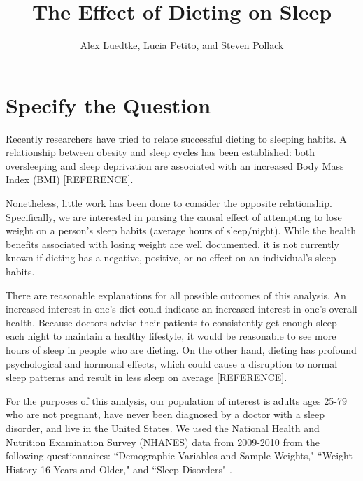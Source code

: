 \documentclass{article}
\begin{document}
%

\newcommand{\E}{\mathbb{E}}
\newcommand{\indp}{\ensuremath{\perp\hspace{-5pt}\perp}}
\newcommand{\M}{\mathcal{M}}
\newcommand{\given}{\; \mid \;}



\title{\textbf{The Effect of Dieting on Sleep}}
\author{Alex Luedtke, Lucia Petito, and Steven Pollack}
\date{}
\maketitle

\section{Specify the Question}

Recently researchers have tried to relate successful dieting to sleeping habits.  A relationship between obesity and sleep cycles has been established: both oversleeping and sleep deprivation are associated with an increased Body Mass Index (BMI) [REFERENCE]. 

Nonetheless, little work has been done to consider the opposite relationship. Specifically, we are interested in parsing the causal effect of attempting to lose weight on a person's sleep habits (average hours of sleep/night). While the health benefits associated with losing weight are well documented, it is not currently known if dieting has a negative, positive, or no effect on an individual's sleep habits.

There are reasonable explanations for all possible outcomes of this analysis.  An increased interest in one's diet could indicate an increased interest in one's overall health.  Because doctors advise their patients to consistently get enough sleep each night to maintain a healthy lifestyle, it would be reasonable to see more hours of sleep in people who are dieting.  On the other hand, dieting has profound psychological and hormonal effects, which could cause a disruption to normal sleep patterns and result in less sleep on average [REFERENCE].

For the purposes of this analysis, our population of interest is adults ages 25-79 who are not pregnant, have never been diagnosed by a doctor with a sleep disorder, and live in the United States.  We used the National Health and Nutrition Examination Survey (NHANES) data from 2009-2010 \cite{data} from the following questionnaires: ``Demographic Variables and Sample Weights," ``Weight History 16 Years and Older," and ``Sleep Disorders" \cite{questionnaire}.
\end{document}
